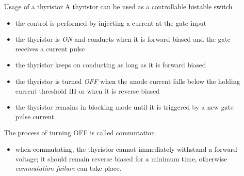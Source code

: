 \begin{frame}[allowframebreaks]{Usage of a thyristor}
A thyristor can be used as a controllable bistable switch
\begin{itemize}
    \item the control is performed by injecting a current at the gate input
    \item the thyristor is \textit{ON} and conducts when it is forward biased and the gate receives a current pulse
    \item the thyristor keeps on conducting as long as it is forward biased
    \item the thyristor is turned \textit{OFF} when the anode current falls below the holding current threshold IH or when it is reverse biased
    \item the thyristor remains in blocking mode until it is triggered by a new gate pulse current
\end{itemize}

The process of turning OFF is called commutation
\begin{itemize}
    \item when commutating, the thyristor cannot immediately withstand a forward voltage; it should remain reverse biased for a minimum time, otherwise \textit{commutation failure} can take place.
\end{itemize}
\end{frame}

